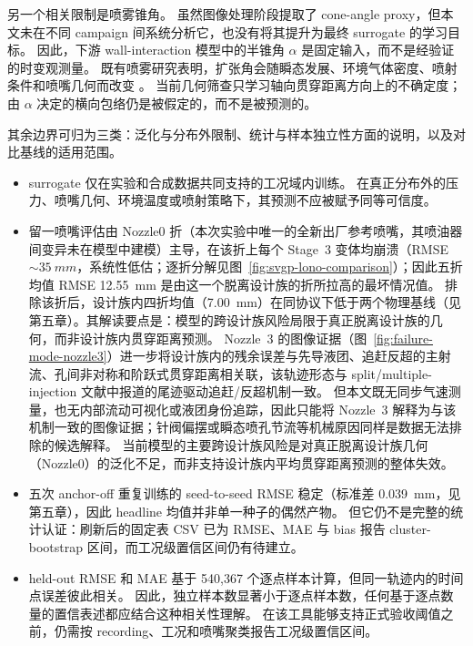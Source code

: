 另一个相关限制是喷雾锥角。
虽然图像处理阶段提取了 cone-angle proxy，但本文未在不同 campaign 间系统分析它，也没有将其提升为最终 surrogate 的学习目标。
因此，下游 wall-interaction 模型中的半锥角 \(\alpha\) 是固定输入，而不是经验证的时变观测量。
既有喷雾研究表明，扩张角会随瞬态发展、环境气体密度、喷射条件和喷嘴几何而改变 \cite{NaberSiebers1996,JungManinSkeenPickett2015}。
当前几何筛查只学习轴向贯穿距离方向上的不确定度；由 \(\alpha\) 决定的横向包络仍是被假定的，而不是被预测的。

其余边界可归为三类：泛化与分布外限制、统计与样本独立性方面的说明，以及对比基线的适用范围。
\begin{itemize}
	\item surrogate 仅在实验和合成数据共同支持的工况域内训练。
	      在真正分布外的压力、喷嘴几何、环境温度或喷射策略下，其预测不应被赋予同等可信度。

	\item 留一喷嘴评估由 Nozzle0 折（本次实验中唯一的全新出厂参考喷嘴，其喷油器间变异未在模型中建模）主导，在该折上每个 Stage~3 变体均崩溃（RMSE \(\sim\SI{35}{mm}\)，系统性低估；逐折分解见图~\ref{fig:svgp-lono-comparison}）；因此五折均值 RMSE \SI{12.55}{mm} 是由这一个脱离设计族的折所拉高的最坏情况值。
	      排除该折后，设计族内四折均值（\SI{7.00}{mm}）在同协议下低于两个物理基线（见第五章）。其解读要点是：模型的跨设计族风险局限于真正脱离设计族的几何，而非设计族内贯穿距离预测。
	      Nozzle~3 的图像证据（图~\ref{fig:failure-mode-nozzle3}）进一步将设计族内的残余误差与先导液团、追赶反超的主射流、孔间非对称和阶跃式贯穿距离相关联，该轨迹形态与 split/multiple-injection 文献中报道的尾迹驱动追赶/反超机制一致。
	      但本文既无同步气速测量，也无内部流动可视化或液团身份追踪，因此只能将 Nozzle~3 解释为与该机制一致的图像证据；针阀偏摆或瞬态喷孔节流等机械原因同样是数据无法排除的候选解释。
	      当前模型的主要跨设计族风险是对真正脱离设计族几何（Nozzle0）的泛化不足，而非支持设计族内平均贯穿距离预测的整体失效。

	\item 五次 anchor-off 重复训练的 seed-to-seed RMSE 稳定（标准差 \SI{0.039}{mm}，见第五章），因此 headline 均值并非单一种子的偶然产物。
	      但它仍不是完整的统计认证：刷新后的固定表 CSV 已为 RMSE、MAE 与 bias 报告 cluster-bootstrap 区间，而工况级置信区间仍有待建立。

	\item held-out RMSE 和 MAE 基于 540{,}367 个逐点样本计算，但同一轨迹内的时间点误差彼此相关。
	      因此，独立样本数显著小于逐点样本数，任何基于逐点数量的置信表述都应结合这种相关性理解。
	      在该工具能够支持正式验收阈值之前，仍需按 recording、工况和喷嘴聚类报告工况级置信区间。


\end{itemize}
